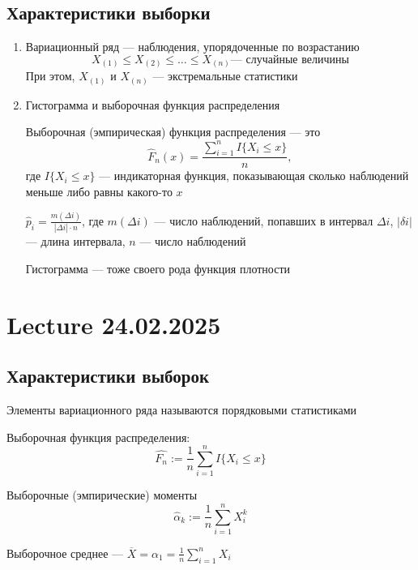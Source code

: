 \documentclass[a4paper, 10pt]{article}
\begin{document}
\subsection{Характеристики выборки}
\begin{enumerate}
    \item Вариационный ряд — наблюдения, упорядоченные по возрастанию
    \begin{equation*}
        X_{(1)}\leqslant X_{(2)}\leqslant\ldots\leqslant X_{(n)}\text{— случайные величины}
    \end{equation*}
    При этом, $X_{(1)}$ и $X_{(n)}$ — экстремальные статистики

    \item Гистограмма и выборочная функция распределения
    
     Выборочная (эмпирическая) функция распределения — это $$\hat{F}_n(x)=\displaystyle\frac{\sum_{i=1}^{n}I\{X_i\leqslant x\}}{n},$$ где $I\{X_i\leqslant x\}$ — индикаторная функция, показывающая сколько наблюдений меньше либо равны какого-то $x$

     $\hat{p}_i=\displaystyle\frac{m(\Delta i)}{|\Delta i|\cdot n}$, где $m(\Delta i)$ — число наблюдений, попавших в интервал $\Delta i$, $|\delta i|$ — длина интервала, $n$ — число наблюдений

    Гистограмма — тоже своего рода функция плотности
\end{enumerate}

\newpage
\section{Lecture 24.02.2025}
\subsection{Характеристики выборок}
 Элементы вариационного ряда называются порядковыми статистиками

 Выборочная функция распределения:
\begin{equation*}
    \widehat{F_n}:=\frac{1}{n}\sum_{i=1}^{n}I\{X_i\leqslant x\}
\end{equation*}

 Выборочные (эмпирические) моменты 
\begin{equation*}
    \widehat{\alpha}_k:=\frac{1}{n}\sum_{i=1}^{n}X_i^k
\end{equation*}

 Выборочное среднее — $\overline{X}=\alpha_1=\displaystyle\frac{1}{n}\sum_{i=1}^{n}X_i$
\end{document}
